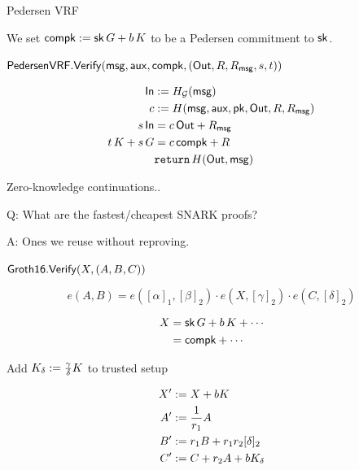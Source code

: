 \documentclass{beamer}
\def\compk{\ensuremath{\mathsf{compk}}\xspace}
\begin{document}
\begin{frame}{Pedersen VRF}

We set $\compk := \sk \, G + b \, K$ to be a Pedersen commitment to $\mathsf{sk}$.

\bigskip\bigskip

$\mathsf{PedersenVRF}.\Verify(\msg,\aux,\compk,(\Out,R,R_\msg,s,t))$
	
$$ \begin{aligned}
\In &:= H_{\mathcal{G}}(\msg) \\
c &:= H(\msg,\aux,\pk,\Out,R,R_\msg) \\
s \, \In &= c \, \Out + R_\msg \\
t \, K + s \, G &= c \, \compk + R \\
& \mathtt{return} \, H(\Out,\msg) \\
\end{aligned} $$
	
\end{frame}



\begin{frame}
	
Zero-knowledge continuations..
	
\bigskip
	
Q: What are the fastest/cheapest SNARK proofs?
	
\bigskip
	
A: Ones we reuse without reproving.
	
\end{frame}



\begin{frame}

$\mathsf{Groth16}.{\mathsf{Verify}}(X,(A,B,C))$

$$ e(A,B) = e([\alpha]_1, [\beta]_2) \cdot e(X, [\gamma]_2) \cdot e(C, [\delta]_2) $$

\pause\medskip

$$ \begin{aligned}
 X &= \sk \, G + b \, K + \cdots \\
   &= \compk + \cdots \\
\end{aligned} $$

\pause\bigskip

Add $K_\delta := {\gamma\over\delta} K$ to trusted setup

$$ \begin{aligned}
X' &:= X + b K \\
A' &:= {1 \over r_1} A \\
B' &:= r_1 B + r_1 r_2 [\delta]_2 \\
C' &:= C + r_2 A + b K_\delta \\
\end{aligned} $$

\end{frame}
\end{document}
